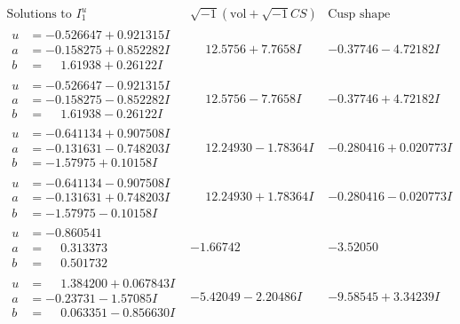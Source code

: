 \documentclass[1p]{elsarticle_modified}
\theoremstyle{definition}
\newcommand{\I}{\sqrt{-1}}
\begin{document}
$$\begin{array}{c|c|c}  
\text{Solutions to }I^u_{1}& \I (\text{vol} + \sqrt{-1}CS) & \text{Cusp shape}\\
 \hline 
\begin{aligned}
u &= -0.526647 + 0.921315 I \\
a &= -0.158275 + 0.852282 I \\
b &= \phantom{-}1.61938 + 0.26122 I\end{aligned}
 & \phantom{-}12.5756 + 7.7658 I & -0.37746 - 4.72182 I \\ \hline\begin{aligned}
u &= -0.526647 - 0.921315 I \\
a &= -0.158275 - 0.852282 I \\
b &= \phantom{-}1.61938 - 0.26122 I\end{aligned}
 & \phantom{-}12.5756 - 7.7658 I & -0.37746 + 4.72182 I \\ \hline\begin{aligned}
u &= -0.641134 + 0.907508 I \\
a &= -0.131631 - 0.748203 I \\
b &= -1.57975 + 0.10158 I\end{aligned}
 & \phantom{-}12.24930 - 1.78364 I & -0.280416 + 0.020773 I \\ \hline\begin{aligned}
u &= -0.641134 - 0.907508 I \\
a &= -0.131631 + 0.748203 I \\
b &= -1.57975 - 0.10158 I\end{aligned}
 & \phantom{-}12.24930 + 1.78364 I & -0.280416 - 0.020773 I \\ \hline\begin{aligned}
u &= -0.860541\phantom{ +0.000000I} \\
a &= \phantom{-}0.313373\phantom{ +0.000000I} \\
b &= \phantom{-}0.501732\phantom{ +0.000000I}\end{aligned}
 & -1.66742\phantom{ +0.000000I} & -3.52050\phantom{ +0.000000I} \\ \hline\begin{aligned}
u &= \phantom{-}1.384200 + 0.067843 I \\
a &= -0.23731 - 1.57085 I \\
b &= \phantom{-}0.063351 - 0.856630 I\end{aligned}
 & -5.42049 - 2.20486 I & -9.58545 + 3.34239 I \\ \hline\begin{aligned}

\end{aligned}
\end{array}$$
\end{document}
